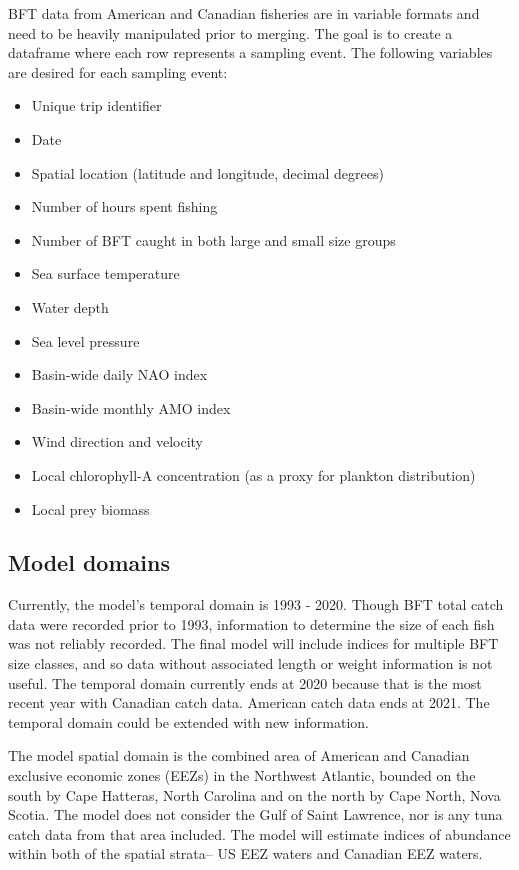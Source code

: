 \documentclass[
]{article}
\providecommand{\tightlist}{%
  \setlength{\itemsep}{0pt}\setlength{\parskip}{0pt}}
\begin{document}
BFT data from American and Canadian fisheries are in variable formats and need to be heavily manipulated prior to merging. The goal is to create a dataframe where each row represents a sampling event. The following variables are desired for each sampling event:

\begin{itemize}
\tightlist
\item
  Unique trip identifier
\item
  Date
\item
  Spatial location (latitude and longitude, decimal degrees)
\item
  Number of hours spent fishing
\item
  Number of BFT caught in both large and small size groups
\item
  Sea surface temperature
\item
  Water depth
\item
  Sea level pressure
\item
  Basin-wide daily NAO index
\item
  Basin-wide monthly AMO index
\item
  Wind direction and velocity
\item
  Local chlorophyll-A concentration (as a proxy for plankton distribution)
\item
  Local prey biomass
\end{itemize}

\hypertarget{model-domains}{%
\subsection{Model domains}\label{model-domains}}

Currently, the model's temporal domain is 1993 - 2020. Though BFT total catch data were recorded prior to 1993, information to determine the size of each fish was not reliably recorded. The final model will include indices for multiple BFT size classes, and so data without associated length or weight information is not useful. The temporal domain currently ends at 2020 because that is the most recent year with Canadian catch data. American catch data ends at 2021. The temporal domain could be extended with new information.

The model spatial domain is the combined area of American and Canadian exclusive economic zones (EEZs) in the Northwest Atlantic, bounded on the south by Cape Hatteras, North Carolina and on the north by Cape North, Nova Scotia. The model does not consider the Gulf of Saint Lawrence, nor is any tuna catch data from that area included. The model will estimate indices of abundance within both of the spatial strata-- US EEZ waters and Canadian EEZ waters.
\end{document}
